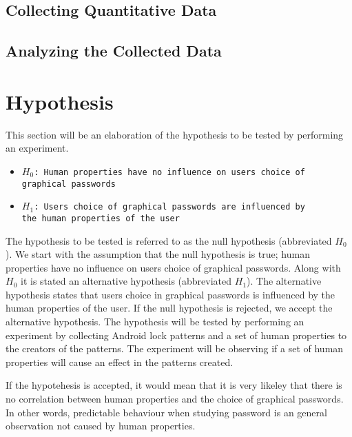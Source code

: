 		\subsection{Collecting Quantitative Data}

			

		\subsection{Analyzing the Collected Data}

	\clearpage
	\section{Hypothesis}\label{sec:hypothesis}

		This section will be an elaboration of the hypothesis to be tested by performing an experiment.

		{\renewcommand\labelitemi{}
			\begin{itemize}
	  		\item \texttt{$H_{0}$: Human properties have no influence on users choice of \\graphical passwords}
	  		\item \texttt{$H_{1}$: Users choice of graphical passwords are influenced by \\the human properties of the user}
	  	\end{itemize}
	  }

	  The hypothesis to be tested is referred to as the null hypothesis (abbreviated $H_{0}$). We start with the assumption that the null hypothesis is true; human properties have no influence on users choice of graphical passwords. Along with $H_{0}$ it is stated an alternative hypothesis (abbreviated $H_{1}$). The alternative hypothesis states that users choice in graphical passwords is influenced by the human properties of the user. If the null hypothesis is rejected, we accept the alternative hypothesis. The hypothesis will be tested by performing an experiment by collecting Android lock patterns and a set of human properties to the creators of the patterns. The experiment will be observing if a set of human properties will cause an effect in the patterns created.

	  If the hypotehesis is accepted, it would mean that it is very likeley that there is no correlation between human properties and the choice of graphical passwords. In other words, predictable behaviour when studying password is an general observation not caused by human properties.

